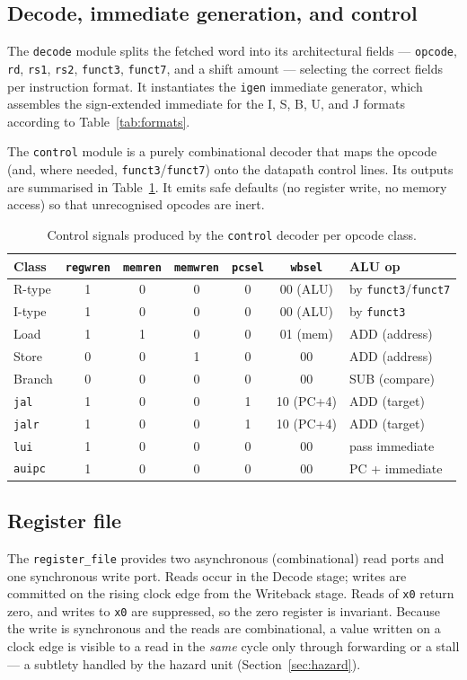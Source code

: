 \documentclass[11pt,a4paper]{article}
\newcommand{\code}[1]{\texttt{#1}}          %
\newcommand{\sig}[1]{\texttt{#1}}
\begin{document}
\subsection{Decode, immediate generation, and control}
The \code{decode} module splits the fetched word into its architectural fields ---
\sig{opcode}, \sig{rd}, \sig{rs1}, \sig{rs2}, \sig{funct3}, \sig{funct7}, and a shift
amount --- selecting the correct fields per instruction format. It instantiates the
\code{igen} immediate generator, which assembles the sign-extended immediate for the I,
S, B, U, and J formats according to Table~\ref{tab:formats}.

The \code{control} module is a purely combinational decoder that maps the opcode (and,
where needed, \sig{funct3}/\sig{funct7}) onto the datapath control lines. Its outputs are
summarised in Table~\ref{tab:control}. It emits safe defaults (no register write, no
memory access) so that unrecognised opcodes are inert.

\begin{table}[h]
\centering
\caption{Control signals produced by the \code{control} decoder per opcode class.}
\label{tab:control}
\small
\begin{tabular}{@{}l c c c c c l@{}}
\toprule
\textbf{Class} & \sig{regwren} & \sig{memren} & \sig{memwren} & \sig{pcsel} & \sig{wbsel} & \textbf{ALU op} \\
\midrule
R-type   & 1 & 0 & 0 & 0 & 00 (ALU) & by \sig{funct3}/\sig{funct7} \\
I-type   & 1 & 0 & 0 & 0 & 00 (ALU) & by \sig{funct3} \\
Load     & 1 & 1 & 0 & 0 & 01 (mem) & ADD (address) \\
Store    & 0 & 0 & 1 & 0 & 00       & ADD (address) \\
Branch   & 0 & 0 & 0 & 0 & 00       & SUB (compare) \\
\sig{jal}  & 1 & 0 & 0 & 1 & 10 (PC+4) & ADD (target) \\
\sig{jalr} & 1 & 0 & 0 & 1 & 10 (PC+4) & ADD (target) \\
\sig{lui}  & 1 & 0 & 0 & 0 & 00       & pass immediate \\
\sig{auipc}& 1 & 0 & 0 & 0 & 00       & PC + immediate \\
\bottomrule
\end{tabular}
\end{table}

\subsection{Register file}
The \code{register\_file} provides two asynchronous (combinational) read ports and one
synchronous write port. Reads occur in the Decode stage; writes are committed on the
rising clock edge from the Writeback stage. Reads of \sig{x0} return zero, and writes to
\sig{x0} are suppressed, so the zero register is invariant. Because the write is
synchronous and the reads are combinational, a value written on a clock edge is visible to
a read in the \emph{same} cycle only through forwarding or a stall --- a subtlety handled
by the hazard unit (Section~\ref{sec:hazard}).
\end{document}
